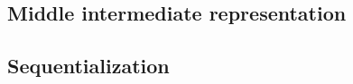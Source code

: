 \documentclass[index.tex]{subfiles}
\begin{document}
\subsection{Middle intermediate representation}
\label{sec:mir}

\subsection{Sequentialization}
\label{sec:sequentialization}
\end{document}

